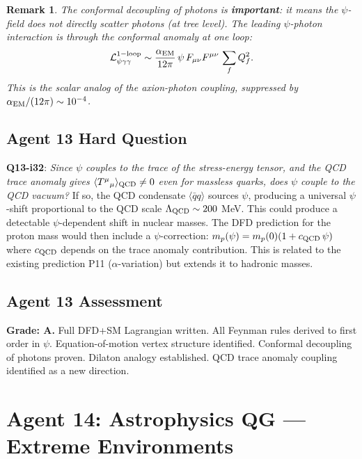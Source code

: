 \documentclass[11pt,a4paper]{article}
\newtheorem{remark}{Remark}
\begin{document}
\begin{remark}
The conformal decoupling of photons is \textbf{important}: it means the $\psi$-field does not directly scatter photons (at tree level). The leading $\psi$-photon interaction is through the conformal anomaly at one loop:
\begin{equation}
\mathcal{L}_{\psi\gamma\gamma}^{\rm 1-loop} \sim \frac{\alpha_{\rm EM}}{12\pi}\,\psi\,F_{\mu\nu}F^{\mu\nu}\,\sum_f Q_f^2.
\end{equation}
This is the scalar analog of the axion-photon coupling, suppressed by $\alpha_{\rm EM}/(12\pi) \sim 10^{-4}$.
\end{remark}

\subsection{Agent 13 Hard Question}

\textbf{Q13-i32}: \emph{Since $\psi$ couples to the trace of the stress-energy tensor, and the QCD trace anomaly gives $\langle T^\mu{}_\mu\rangle_{\rm QCD} \neq 0$ even for massless quarks, does $\psi$ couple to the QCD vacuum?} If so, the QCD condensate $\langle\bar{q}q\rangle$ sources $\psi$, producing a universal $\psi$-shift proportional to the QCD scale $\Lambda_{\rm QCD} \sim 200$ MeV. This could produce a detectable $\psi$-dependent shift in nuclear masses. The DFD prediction for the proton mass would then include a $\psi$-correction: $m_p(\psi) = m_p(0)(1 + c_{\rm QCD}\,\psi)$ where $c_{\rm QCD}$ depends on the trace anomaly contribution. This is related to the existing prediction P11 ($\alpha$-variation) but extends it to hadronic masses.

\subsection{Agent 13 Assessment}

\textbf{Grade: A.} Full DFD+SM Lagrangian written. All Feynman rules derived to first order in $\psi$. Equation-of-motion vertex structure identified. Conformal decoupling of photons proven. Dilaton analogy established. QCD trace anomaly coupling identified as a new direction.


\newpage
\section{Agent 14: Astrophysics QG --- Extreme Environments}
\label{sec:agent14}
\end{document}
